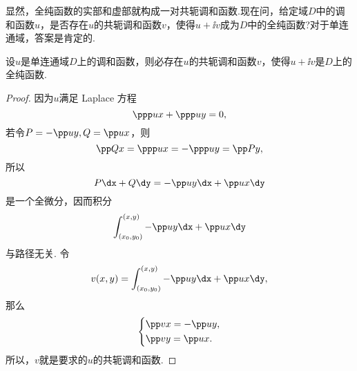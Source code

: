 显然，全纯函数的实部和虚部就构成一对共轭调和函数.现在问，给定域$D$中的调和函数$u$，是否存在$u$的共轭调和函数$v$，使得$u+\ii v$成为$D$中的全纯函数?对于单连通域，答案是肯定的.
\begin{theorem}
设$u$是单连通域$D$上的调和函数，则必存在$u$的共轭调和函数$v$，使得$u+\ii v$是$D$上的全纯函数.
\end{theorem}
\begin{proof}
  因为$u$满足 Laplace 方程
  \[\ppp ux+\ppp uy=0,\]
若令$P=-\pp uy,Q=\pp ux$，则
\[\pp Qx=\ppp ux=-\ppp uy=\pp Py,\]
所以
\[P\dx+Q\dy=-\pp uy\dx+\pp ux\dy\]
是一个全微分，因而积分
\[\int_{(x_0,y_0)}^{(x,y)}-\pp uy\dx+\pp ux\dy\]
与路径无关. 令
\[v(x,y)=\int_{(x_0,y_0)}^{(x,y)}-\pp uy\dx+\pp ux\dy,\]
那么
\[\left\{\begin{aligned}
&\pp vx=-\pp uy,\\
&\pp vy=\pp ux.
\end{aligned}\right.\]
所以，$v$就是要求的$u$的共轭调和函数.
\end{proof}


